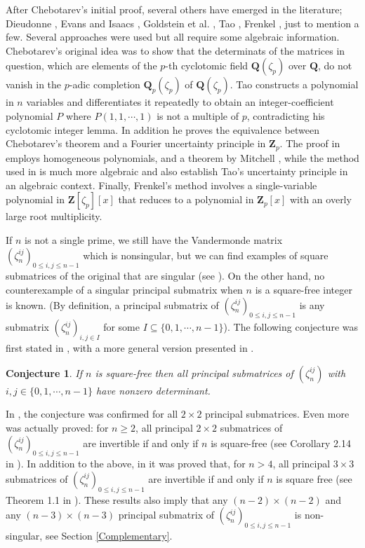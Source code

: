 \documentclass[10pt,a4paper]{amsart}
\newtheorem{conjecture}{Conjecture}
\def\Z{\mathbf{Z}}
\def\Q{\mathbf{Q}}
\begin{document}
After Chebotarev's initial proof, several others have emerged in the literature; Dieudonne \cite{Dieudonne}, Evans and Isaacs \cite{EvIs}, Goldstein et al. \cite{Gold},  Tao \cite{Tao}, Frenkel \cite{Frenkel},
 just to mention a few. Several approaches were used but  all require some  algebraic information. Chebotarev's original idea was to show that the 
  determinats of the matrices in question, which are  elements of the $p$-th cyclotomic field $\Q(\zeta_p)$ over $\Q$,  do not vanish in the $p$-adic completion $\Q_p(\zeta_p)$  of $\Q(\zeta_p)$. Tao \cite{Tao} constructs a polynomial in $n$ variables and differentiates it repeatedly to obtain an integer-coefficient polynomial $P$ where $P(1, 1, \cdots , 1)$ is not a multiple of $p$, contradicting his cyclotomic integer lemma. In addition he  proves the equivalence between Chebotarev's theorem and a Fourier uncertainty principle in $\Z_p$. The proof in  \cite{EvIs} employs homogeneous polynomials, and  a theorem by Mitchell \cite{Mitchell}, while  the method used in  \cite{Gold} is much more algebraic and also establish Tao's uncertainty principle in an algebraic context. Finally, Frenkel's method involves a single-variable polynomial in $\Z[\zeta_p][x]$ that reduces to a polynomial in $\Z_p[x]$ with an overly large root multiplicity.

 If $n$ is not a single prime, we still have the Vandermonde matrix $(\zeta_n^{ij})_{0 \leq i, j \leq n-1}$ which is nonsingular, but we can find examples of square submatrices of the original that are singular (see \cite{CL.24}). On the other hand, no counterexample of a singular principal submatrix when $n$ is a square-free integer is known.  (By definition, a principal submatrix  of $(\zeta_n^{ij})_{0 \leq i,j \leq n-1}$ is any submatrix $(\zeta_n^{ij})_{i,j \in I}$ for   some $I \subseteq \{0, 1, \cdots, n-1 \}$).  The following conjecture was first stated in \cite{Cabreli}, with a more general version presented in \cite{CL.24}.
 \begin{conjecture}\label{Conjecture}
 If $n$ is square-free then all principal submatrices of $(\zeta_n^{ij})$ with $i,j \in \{ 0, 1, \cdots, n-1\}$
 have nonzero determinant.     
 \end{conjecture}

In \cite{Cabreli}, the conjecture was confirmed for all $2 \times 2$ principal submatrices. Even more was actually proved:  for $n \geq 2$, all principal $2 \times 2$ submatrices of $(\zeta_n^{ij})_{0\leq i,j \leq n-1}$ are invertible if and only if $n$ is square-free (see Corollary 2.14 in \cite{Cabreli}).
  In addition to the above,  in \cite{CL.24} it was proved that, for $n >4$,  all principal  $3 \times 3$ submatrices of
 $(\zeta_n^{ij})_{0\leq i,j \leq n-1}$ are invertible if and only if $n$ is square free (see Theorem 1.1 in \cite{CL.24}).
These  results also imply that  any  $(n-2) \times (n-2)$ and any  $(n-3) \times (n-3)$ principal submatrix 
of $(\zeta_n^{ij})_{0\leq i,j \leq n-1}$ is non-singular, see Section \ref{Complementary}.
\end{document}
